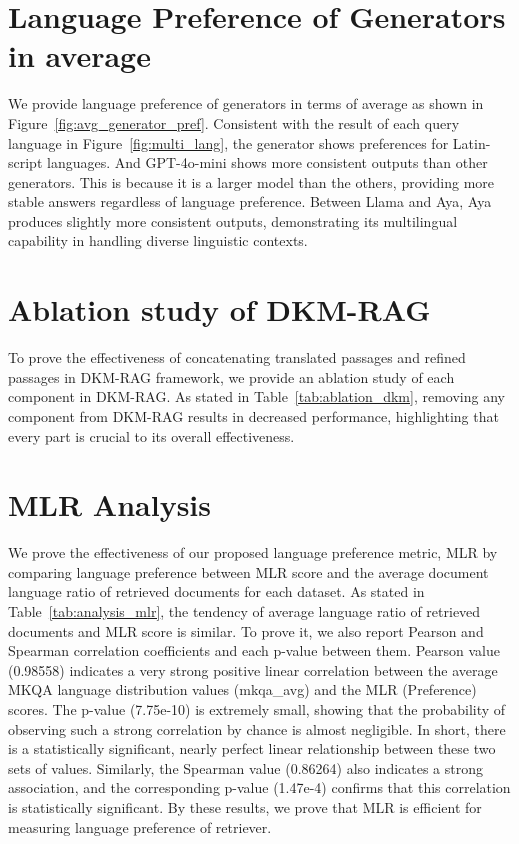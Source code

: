 \section{Language Preference of Generators in average}
We provide language preference of generators in terms of average as shown in Figure~\ref{fig:avg_generator_pref}. Consistent with the result of each query language in Figure~\ref{fig:multi_lang}, the generator shows preferences for Latin-script languages. And GPT-4o-mini shows more consistent outputs than other generators. This is because it is a larger model than the others, providing more stable answers regardless of language preference. Between Llama and Aya, Aya produces slightly more consistent outputs, demonstrating its multilingual capability in handling diverse linguistic contexts.


\section{Ablation study of DKM-RAG}
To prove the effectiveness of concatenating translated passages and refined passages in DKM-RAG framework, we provide an ablation study of each component in DKM-RAG. As stated in Table~\ref{tab:ablation_dkm}, removing any component from DKM-RAG results in decreased performance, highlighting that every part is crucial to its overall effectiveness.






\section{MLR Analysis}
We prove the effectiveness of our proposed language preference metric, MLR by comparing language preference between MLR score and the average document language ratio of retrieved documents for each dataset. As stated in Table~\ref{tab:analysis_mlr}, the tendency of average language ratio of retrieved documents and MLR score is similar. To prove it, we also report Pearson and Spearman correlation coefficients and each p-value between them. Pearson value (0.98558) indicates a very strong positive linear correlation between the average MKQA language distribution values (mkqa\_avg) and the MLR (Preference) scores. The p-value (7.75e-10) is extremely small, showing that the probability of observing such a strong correlation by chance is almost negligible. In short, there is a statistically significant, nearly perfect linear relationship between these two sets of values. Similarly, the Spearman value (0.86264) also indicates a strong association, and the corresponding p-value (1.47e-4) confirms that this correlation is statistically significant. By these results, we prove that MLR is efficient for measuring language preference of retriever.




